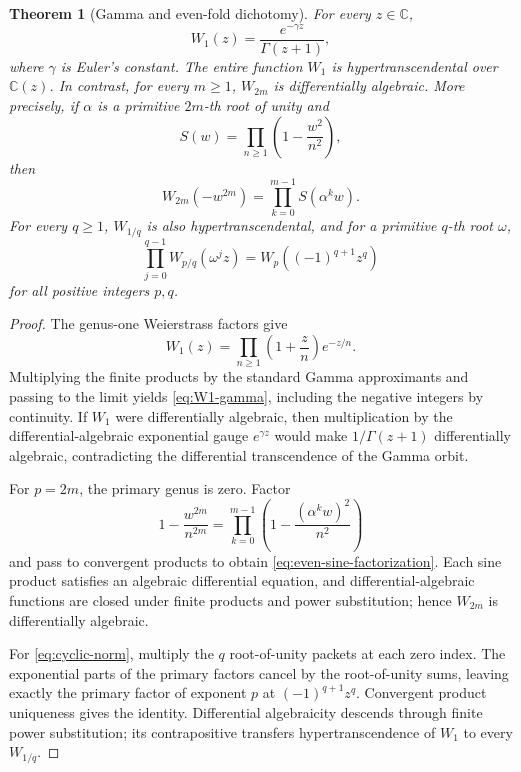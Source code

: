\documentclass[11pt]{article}
\newtheorem{theorem}{Theorem}[section]
\theoremstyle{definition}
\theoremstyle{remark}
\newcommand{\C}{\mathbb C}
\begin{document}
\begin{theorem}[Gamma and even-fold dichotomy]
\label{thm:gamma-even}
For every \(z\in\C\),
\[
                  W_1(z)=
                  \frac{e^{-\gamma z}}{\Gamma(z+1)},
\tag{7.1}\label{eq:W1-gamma}
\]
where \(\gamma\) is Euler's constant.  The entire function \(W_1\) is
hypertranscendental over \(\C(z)\).  In contrast, for every \(m\ge1\),
\(W_{2m}\) is differentially algebraic.  More precisely, if
\(\alpha\) is a primitive \(2m\)-th root of unity and
\[
                  S(w)=\prod_{n\ge1}
                        \left(1-\frac{w^2}{n^2}\right),
\]
then
\[
 W_{2m}(-w^{2m})=
        \prod_{k=0}^{m-1}S(\alpha^kw).
\tag{7.2}\label{eq:even-sine-factorization}
\]
For every \(q\ge1\), \(W_{1/q}\) is also hypertranscendental, and for a
primitive \(q\)-th root \(\omega\),
\[
 \prod_{j=0}^{q-1}W_{p/q}(\omega^jz)
   =W_p((-1)^{q+1}z^q)
\tag{7.3}\label{eq:cyclic-norm}
\]
for all positive integers \(p,q\).
\end{theorem}

\begin{proof}
The genus-one Weierstrass factors give
\[
 W_1(z)=\prod_{n\ge1}
       \left(1+\frac zn\right)e^{-z/n}.
\]
Multiplying the finite products by the standard Gamma approximants and
passing to the limit yields \eqref{eq:W1-gamma}, including the negative
integers by continuity.  If \(W_1\) were differentially algebraic, then
multiplication by the differential-algebraic exponential gauge
\(e^{\gamma z}\) would make \(1/\Gamma(z+1)\) differentially algebraic,
contradicting the differential transcendence of the Gamma orbit.

For \(p=2m\), the primary genus is zero.  Factor
\[
 1-\frac{w^{2m}}{n^{2m}}
   =\prod_{k=0}^{m-1}
      \left(1-\frac{(\alpha^kw)^2}{n^2}\right)
\]
and pass to convergent products to obtain
\eqref{eq:even-sine-factorization}.  Each sine product satisfies an
algebraic differential equation, and differential-algebraic functions are
closed under finite products and power substitution; hence \(W_{2m}\) is
differentially algebraic.

For \eqref{eq:cyclic-norm}, multiply the \(q\) root-of-unity packets at each
zero index.  The exponential parts of the primary factors cancel by the
root-of-unity sums, leaving exactly the primary factor of exponent \(p\) at
\((-1)^{q+1}z^q\).  Convergent product uniqueness gives the identity.
Differential algebraicity descends through finite power substitution; its
contrapositive transfers hypertranscendence of \(W_1\) to every
\(W_{1/q}\).
\end{proof}
\end{document}
